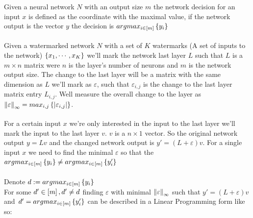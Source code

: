 \documentclass[a4paper]{llncs}
\begin{document}
Given a neural network $N$ with an output size $m$ the network
decision for an input $x$ is defined as the coordinate with the
maximal value, if the network output is the vector $y$ the decision is
$argmax_{i\in \left[m\right]} \left\lbrace y_i\right\rbrace$
\\\\
Given a watermarked network $N$ with a set of $K$ watermarks (A set of
inputs to the network) $\left\lbrace x_1,\cdots,x_K\right\rbrace$ we'll mark the
network last layer $L$ such that $L$ is a $m\times n$ matrix were $n$
is the layer's number of neurons and $m$ is the network output size.
The change to the last layer will be a matrix with the same dimension
as $L$ we'll mark as $\varepsilon$, such that $\varepsilon_{i,j}$ is
the change to the last layer matrix entry $L_{i,j}$. Well measure the
overall change to the layer as
$\left\lVert\varepsilon\right\rVert_{\infty} =
max_{i,j}\left\lbrace \left\lvert\varepsilon_{i,j}\right\rvert\right\rbrace$.
\\\\
For a certain input $x$ we're only interested in the input to the last
layer we'll mark the input to the last layer $v$. $v$ is a $n\times 1$
vector.  So the original network output $y = Lv$ and the changed
network output is $y' = (L+\varepsilon)v$. For a single input $x$ we
need to find the minimal $\varepsilon$ so that the
$argmax_{i\in\left[m\right]}\left\lbrace y_i\right\rbrace\neq
argmax_{i\in\left[m\right]}\left\lbrace y'_i\right\rbrace$
\\\\
Denote $d := argmax_{i\in \left[m\right]} \left\lbrace y_i\right\rbrace$ \\
For some $d'\in\left[m\right],d'\neq d$ finding $\varepsilon$ with
minimal $\left\lVert\varepsilon\right\rVert_{\infty}$ such that
$y' = (L+\varepsilon)v\,$ and
$\,d' = argmax_{i\in\left[m\right]}\left\lbrace y'_i\right\rbrace$ can be described
in a Linear Programming form like so:
\end{document}

